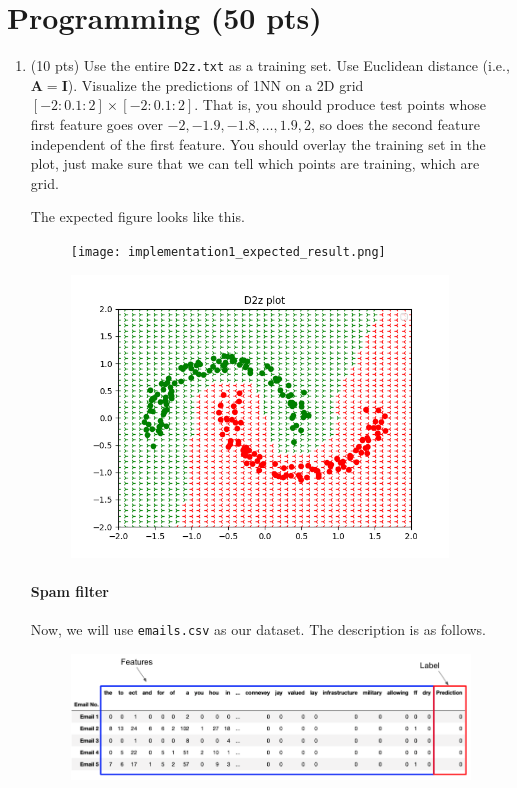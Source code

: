 \documentclass[a4paper]{article}
\theoremstyle{definition}
\renewcommand\vec[1]{\mathbf{#1}}
\begin{document}
\section{Programming (50 pts)}
\begin{enumerate}
  \item (10 pts) Use the entire {\tt D2z.txt} as a training set.  Use Euclidean distance (i.e., $\vec A=\vec I$).
        Visualize the predictions of 1NN on a 2D grid $[-2:0.1:2]\times [-2:0.1:2]$.
        That is, you should produce test points whose first feature goes over $-2, -1.9, -1.8, \ldots, 1.9, 2$, so does the second feature independent of the first feature.
        You should overlay the training set in the plot, just make sure that we can tell which points are training, which are grid.

        The expected figure looks like this.
        \begin{figure}[h]
          \centering
          \texttt{[image: implementation1\_expected\_result.png]}
        \end{figure}


        \begin{figure}[h]
          \centering
          \includegraphics[width=10cm]{1.png}
        \end{figure}


        \paragraph{Spam filter} Now, we will use {\tt emails.csv} as our dataset. The description is as follows.
        \begin{figure}[h]
          \centering
          \includegraphics[width=18cm]{email_head.png}
        \end{figure}


\end{enumerate}
\end{document}
